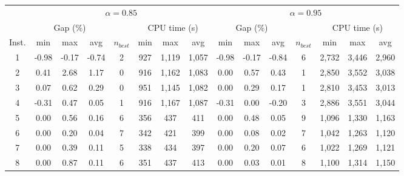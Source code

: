 \documentclass[11pt]{article}
\begin{document}
\begin{table}[H]
    \centering
    \scriptsize
\begin{tabular}{ccccccccccccccc}
\toprule
 & \multicolumn{7}{c}{$\alpha=0.85$} & \multicolumn{7}{c}{$\alpha=0.95$} \\ \cline{3-7} \cline{10-14}
 & \multicolumn{3}{c}{Gap (\%)} &  & \multicolumn{3}{c}{CPU time (s)} & \multicolumn{3}{c}{Gap (\%)} &  & \multicolumn{3}{c}{CPU time (s)} \\ \cline{2-4} \cline{6-8}  \cline{9-11} \cline{13-15} 
Inst. & min & max & avg & $n_{best}$ & min & max & avg & min & max & avg & $n_{best}$ & min & max & avg \\ \hline
\multicolumn{1}{c|}{1} & -0.98 & -0.17 & \multicolumn{1}{c|}{-0.74} & \multicolumn{1}{c|}{2} & 927 & 1,119 & \multicolumn{1}{c|}{1,057} & -0.98 & -0.17 & \multicolumn{1}{c|}{-0.84} & \multicolumn{1}{c|}{6} & 2,732 & 3,446 & 2,960 \\
\multicolumn{1}{c|}{2} & 0.41 & 2.68 & \multicolumn{1}{c|}{1.17} & \multicolumn{1}{c|}{0} & 916 & 1,162 & \multicolumn{1}{c|}{1,083} & 0.00 & 0.57 & \multicolumn{1}{c|}{0.43} & \multicolumn{1}{c|}{1} & 2,850 & 3,552 & 3,038 \\
\multicolumn{1}{c|}{3} & 0.07 & 0.62 & \multicolumn{1}{c|}{0.29} & \multicolumn{1}{c|}{0} & 951 & 1,145 & \multicolumn{1}{c|}{1,082} & 0.00 & 0.29 & \multicolumn{1}{c|}{0.17} & \multicolumn{1}{c|}{1} & 2,810 & 3,453 & 3,013 \\
\multicolumn{1}{c|}{4} & -0.31 & 0.47 & \multicolumn{1}{c|}{0.05} & \multicolumn{1}{c|}{1} & 916 & 1,167 & \multicolumn{1}{c|}{1,087} & -0.31 & 0.00 & \multicolumn{1}{c|}{-0.20} & \multicolumn{1}{c|}{3} & 2,886 & 3,551 & 3,044 \\ \hline
\multicolumn{1}{c|}{5} & 0.00 & 0.56 & \multicolumn{1}{c|}{0.16} & \multicolumn{1}{c|}{6} & 356 & 437 & \multicolumn{1}{c|}{411} & 0.00 & 0.48 & \multicolumn{1}{c|}{0.05} & \multicolumn{1}{c|}{9} & 1,096 & 1,330 & 1,163 \\
\multicolumn{1}{c|}{6} & 0.00 & 0.20 & \multicolumn{1}{c|}{0.04} & \multicolumn{1}{c|}{7} & 342 & 421 & \multicolumn{1}{c|}{399} & 0.00 & 0.08 & \multicolumn{1}{c|}{0.02} & \multicolumn{1}{c|}{7} & 1,042 & 1,263 & 1,120 \\
\multicolumn{1}{c|}{7} & 0.00 & 0.39 & \multicolumn{1}{c|}{0.11} & \multicolumn{1}{c|}{5} & 338 & 434 & \multicolumn{1}{c|}{397} & 0.00 & 0.20 & \multicolumn{1}{c|}{0.07} & \multicolumn{1}{c|}{6} & 1,022 & 1,269 & 1,121 \\
\multicolumn{1}{c|}{8} & 0.00 & 0.87 & \multicolumn{1}{c|}{0.11} & \multicolumn{1}{c|}{6} & 351 & 437 & \multicolumn{1}{c|}{413} & 0.00 & 0.03 & \multicolumn{1}{c|}{0.01} & \multicolumn{1}{c|}{8} & 1,100 & 1,314 & 1,150 \\ \hline

\end{tabular}
\end{table}
\end{document}

